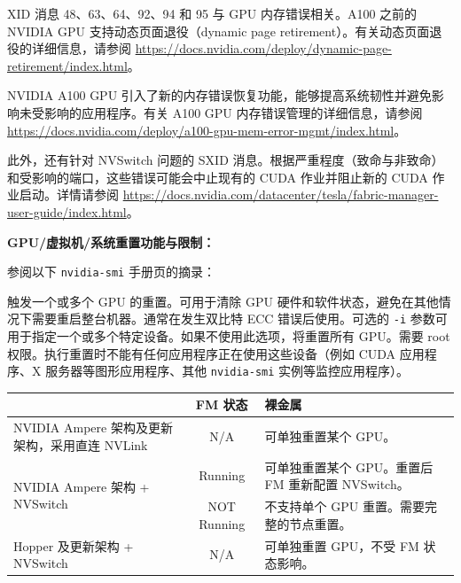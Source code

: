 \documentclass[11pt,UTF8,fontset=fandol,openany]{ctexrep}
\begin{document}
XID 消息 48、63、64、92、94 和 95 与 GPU 内存错误相关。A100 之前的 NVIDIA GPU 支持动态页面退役（dynamic page retirement）。有关动态页面退役的详细信息，请参阅 \url{https://docs.nvidia.com/deploy/dynamic-page-retirement/index.html}。

NVIDIA A100 GPU 引入了新的内存错误恢复功能，能够提高系统韧性并避免影响未受影响的应用程序。有关 A100 GPU 内存错误管理的详细信息，请参阅 \url{https://docs.nvidia.com/deploy/a100-gpu-mem-error-mgmt/index.html}。

此外，还有针对 NVSwitch 问题的 SXID 消息。根据严重程度（致命与非致命）和受影响的端口，这些错误可能会中止现有的 CUDA 作业并阻止新的 CUDA 作业启动。详情请参阅 \url{https://docs.nvidia.com/datacenter/tesla/fabric-manager-user-guide/index.html}。

\vspace{1em}
\noindent\textbf{\color{nvidiagreen}GPU/虚拟机/系统重置功能与限制：}

\vspace{0.5em}
参阅以下 \texttt{nvidia-smi} 手册页的摘录：

\vspace{0.3em}
{\small
触发一个或多个 GPU 的重置。可用于清除 GPU 硬件和软件状态，避免在其他情况下需要重启整台机器。通常在发生双比特 ECC 错误后使用。可选的 \texttt{-i} 参数可用于指定一个或多个特定设备。如果不使用此选项，将重置所有 GPU。需要 root 权限。执行重置时不能有任何应用程序正在使用这些设备（例如 CUDA 应用程序、X 服务器等图形应用程序、其他 \texttt{nvidia-smi} 实例等监控应用程序）。
}

\vspace{1em}

\begin{table}[H]
\centering
\small
\begin{tabular}{p{5.8cm} c p{6.5cm}}
\toprule
 & \textbf{FM 状态} & \textbf{裸金属} \\
\midrule
NVIDIA Ampere 架构及更新架构，采用直连 NVLink &
  N/A &
  可单独重置某个 GPU。\\
\midrule
\multirow{2}{5.8cm}{NVIDIA Ampere 架构 + NVSwitch} &
  Running &
  可单独重置某个 GPU。重置后 FM 重新配置 NVSwitch。\\
\cmidrule{2-3}
 & NOT Running &
  不支持单个 GPU 重置。需要完整的节点重置。\\
\midrule
Hopper 及更新架构 + NVSwitch &
  N/A &
  可单独重置 GPU，不受 FM 状态影响。\\
\bottomrule
\end{tabular}
\end{table}
\end{document}
